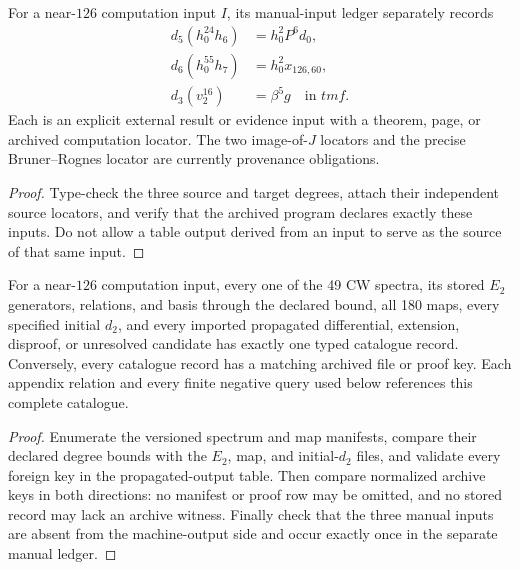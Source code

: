 \begin{proposition}
  \label{prop:appendix-manual-inputs}
  \notready
  For a near-$126$ computation input $I$, its manual-input ledger separately
  records
  \[
  \begin{aligned}
    d_5(h_0^{24}h_6)&=h_0^2P^6d_0,\\
    d_6(h_0^{55}h_7)&=h_0^2x_{126,60},\\
    d_3(v_2^{16})&=\beta^5g\quad\text{in }tmf.
  \end{aligned}
  \]
  Each is an explicit external result or evidence input with a theorem, page,
  or archived computation locator.  The two image-of-$J$ locators and the
  precise Bruner--Rognes locator are currently provenance obligations.
\end{proposition}

\begin{proof}
  Type-check the three source and target degrees, attach their independent
  source locators, and verify that the archived program declares exactly these
  inputs.  Do not allow a table output derived from an input to serve as the
  source of that same input.
\end{proof}

\begin{theorem}
  \label{thm:lin-computation-catalogues-complete}
  \notready
  For a near-$126$ computation input, every one of the 49 CW spectra, its stored
  $E_2$ generators, relations, and basis through the declared bound, all 180
  maps, every specified initial $d_2$, and every imported propagated
  differential, extension, disproof, or unresolved candidate has exactly one
  typed catalogue record.  Conversely, every catalogue record has a matching
  archived file or proof key.  Each appendix relation and every finite negative
  query used below references this complete catalogue.
\end{theorem}

\begin{proof}
  Enumerate the versioned spectrum and map manifests, compare their declared
  degree bounds with the $E_2$, map, and initial-$d_2$ files, and validate every
  foreign key in the propagated-output table.  Then compare normalized archive
  keys in both directions: no manifest or proof row may be omitted, and no
  stored record may lack an archive witness.  Finally check that the three
  manual inputs are absent from the machine-output side and occur exactly once
  in the separate manual ledger.
\end{proof}

